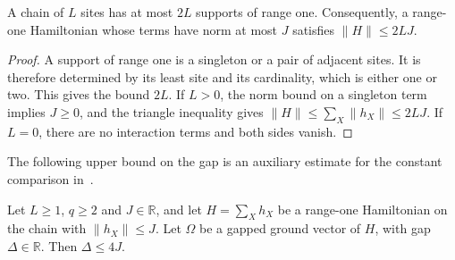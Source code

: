 \begin{lemma}
    \label{thm:chain_range_one_support_count}
    \leanok
    A chain of $L$ sites has at most $2L$ supports of range one.
    Consequently, a range-one Hamiltonian whose terms have norm at most
    $J$ satisfies $\|H\|\le2LJ$.
\end{lemma}
\begin{proof}\leanok
    A support of range one is a singleton or a pair of adjacent sites.
    It is therefore determined by its least site and its cardinality,
    which is either one or two. This gives the bound $2L$.
    If $L>0$, the norm bound on a singleton term implies $J\ge0$, and the
    triangle inequality gives $\|H\|\le\sum_X\|h_X\|\le2LJ$.
    If $L=0$, there are no interaction terms and both sides vanish.
\end{proof}

The following upper bound on the gap is an auxiliary estimate for the constant
comparison in~\cite[lines 291--293 and 509--515]{Landau2015Polynomial}.

\begin{lemma}
    \label{thm:chain_range_one_gap_upper}
    \leanok
    Let $L\ge1$, $q\ge2$ and $J\in\mathbb R$, and let $H=\sum_Xh_X$ be a
    range-one Hamiltonian on the chain with $\lVert h_X\rVert\le J$.
    Let $\Omega$ be a gapped ground vector of $H$, with gap
    $\Delta\in\mathbb R$. Then $\Delta\le4J$.
\end{lemma}

